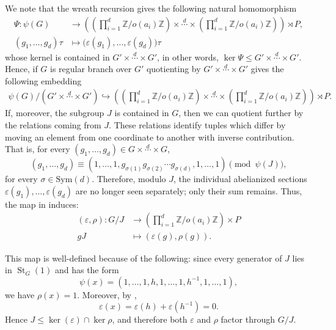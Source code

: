 \documentclass[11pt,leqno]{amsart}
\theoremstyle{plain}
\DeclareMathOperator{\St}{St}
\newcommand{\Sym}{\mathrm{Sym}}
\numberwithin{equation}{section}
\begin{document}
We note that the wreath recursion gives the following natural homomorphism
\begin{align}\label{natural-wreath-recursion}
    \Psi:\psi(G)&\longrightarrow  \left(\left(\prod_{i=1}^d \mathbb Z/o(a_i)\mathbb Z\right)\times \stackrel{d}{\cdots}\times \left(\prod_{i=1}^d \mathbb Z/o(a_i)\mathbb Z\right)\right)\rtimes P,\\
    (g_1,\ldots,g_d)\tau &\longmapsto \bigl(\varepsilon(g_1),\ldots,\varepsilon(g_d)\bigr)\tau\nonumber
\end{align} 
whose kernel is contained in $G'\times \stackrel{d}{\cdots}\times G'$, in other words, $\ker\Psi\leq G'\times \stackrel{d}{\cdots}\times G'$. Hence, if $G$ is regular branch over $G'$ quotienting by $G'\times \stackrel{d}{\cdots}\times G'$ gives the following embedding
\begin{align}\label{Psihook}
    \psi(G)/\left(G'\times \stackrel{d}{\cdots}\times G'\right)\hookrightarrow  \left(\left(\prod_{i=1}^d \mathbb Z/o(a_i)\mathbb Z\right)\times \stackrel{d}{\cdots}\times \left(\prod_{i=1}^d \mathbb Z/o(a_i)\mathbb Z\right)\right)\rtimes P.
\end{align}
If, moreover, the subgroup $J$ is contained in $G$, then we can quotient further by the relations coming from $J$. These relations identify tuples which differ by moving an element from one coordinate to another with inverse contribution. That is, for every $(g_1,\ldots,g_d)\in G\times \stackrel{d}{\cdots}\times G$,
\[
(g_1,\ldots,g_d)\equiv  (1,\ldots,1,g_{\sigma(1)}g_{\sigma(2)}\cdots g_{\sigma(d)},1,\ldots,1)\pmod{\psi(J)},
\]
for every $\sigma\in \Sym(d)$. Therefore, modulo $J$, the individual abelianized sections $\varepsilon(g_1),\ldots,\varepsilon(g_d)$ are no longer seen separately; only their sum remains. Thus, the map in  induces:
\begin{align}\label{GJhookexplicit}
    (\varepsilon,\rho):G/J&\longrightarrow \left(\prod_{i=1}^d\mathbb Z/o(a_i)\mathbb Z \right)\times P\\
    gJ&\longmapsto (\varepsilon(g),\rho(g)).\nonumber
\end{align}



This map is well-defined because of the following: since every generator of $J$ lies in $\St_G(1)$ and has the form
\[
\psi(x)=(1,\ldots,1,h,1,\ldots,1,h^{-1},1,\ldots,1),
\]
we have $\rho(x)=1$. Moreover, by ,
\[
\varepsilon(x)=\varepsilon(h)+\varepsilon(h^{-1})=0.
\]
Hence $J\leq \ker(\varepsilon)\cap\ker\rho$, and therefore both $\varepsilon$ and $\rho$
factor through $G/J$. 
\end{document}
